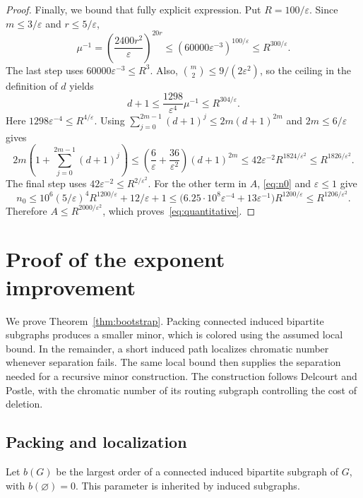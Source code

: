 \documentclass[11pt]{article}
\begin{document}
\begin{proof}
Finally, we bound that fully explicit expression. Put $R=100/\varepsilon$. Since
 $m\le3/\varepsilon$ and $r\le5/\varepsilon$,
\[
 \mu^{-1}
 =\left(\frac{2400r^2}{\varepsilon}\right)^{20r}
 \le(60000\varepsilon^{-3})^{100/\varepsilon}
 \le R^{300/\varepsilon}.
\]
The last step uses $60000\varepsilon^{-3}\le R^3$.
Also, $\binom m2\le9/(2\varepsilon^2)$, so the ceiling in the
definition of $d$ yields
\[
 d+1\le\frac{1298}{\varepsilon^4}\mu^{-1}
 \le R^{304/\varepsilon}.
\]
Here $1298\varepsilon^{-4}\le R^{4/\varepsilon}$.
Using $\sum_{j=0}^{2m-1}(d+1)^j\le2m(d+1)^{2m}$ and $2m\le6/\varepsilon$ gives
\[
 2m\left(1+\sum_{j=0}^{2m-1}(d+1)^j\right)
 \le\left(\frac6\varepsilon+\frac{36}{\varepsilon^2}\right)
           (d+1)^{2m}
 \le42\varepsilon^{-2}R^{1824/\varepsilon^2}
 \le R^{1826/\varepsilon^2}.
\]
The final step uses $42\varepsilon^{-2}\le R^{2/\varepsilon^2}$.
For the other term in $A$, \eqref{eq:n0} and $\varepsilon\le1$ give
\[
 n_0\le10^6(5/\varepsilon)^4R^{1200/\varepsilon}
          +12/\varepsilon+1
 \le\bigl(6.25\cdot10^8\varepsilon^{-4}
           +13\varepsilon^{-1}\bigr)R^{1200/\varepsilon}
 \le R^{1206/\varepsilon^2}.
\]
Therefore $A\le R^{2000/\varepsilon^2}$, which
proves~\eqref{eq:quantitative}.

\end{proof}



\section{Proof of the exponent improvement}\label{sec:bootstrap}

We prove Theorem~\ref{thm:bootstrap}. Packing connected induced
bipartite subgraphs produces a smaller minor, which is colored using
the assumed local bound. In the remainder, a short induced path
localizes chromatic number whenever separation fails. The same local
bound then supplies the separation needed for a recursive minor
construction. The construction follows Delcourt and Postle, with the
chromatic number of its routing subgraph controlling the cost of deletion.

\subsection{Packing and localization}

Let $b(G)$ be the largest order of a connected induced bipartite
subgraph of $G$, with $b(\varnothing)=0$. This parameter is inherited
by induced subgraphs. 
\end{document}
